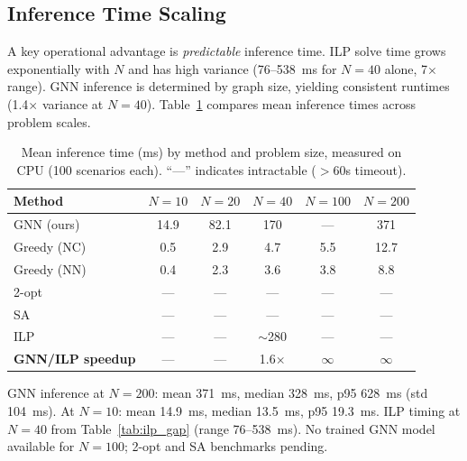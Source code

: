 \documentclass[conference]{IEEEtran}
\begin{document}
\subsection{Inference Time Scaling}\label{sec:timing}

A key operational advantage is \emph{predictable} inference time. ILP solve time grows exponentially with $N$ and has high variance (76--538~ms for $N{=}40$ alone, 7$\times$ range). GNN inference is determined by graph size, yielding consistent runtimes (1.4$\times$ variance at $N{=}40$). Table~\ref{tab:timing} compares mean inference times across problem scales.

\begin{table}[htbp]
\caption{Mean inference time (ms) by method and problem size, measured on CPU (100 scenarios each). ``---'' indicates intractable ($>$60s timeout).}
\label{tab:timing}
\centering
\begin{tabular}{@{}lccccc@{}}
\toprule
\textbf{Method} & $N{=}10$ & $N{=}20$ & $N{=}40$ & $N{=}100$ & $N{=}200$ \\
\midrule
GNN (ours)    & 14.9  & 82.1  & 170   & ---   & 371 \\
Greedy (NC)   & 0.5   & 2.9   & 4.7   & 5.5   & 12.7 \\
Greedy (NN)   & 0.4   & 2.3   & 3.6   & 3.8   & 8.8 \\
2-opt         & ---   & ---   & ---   & ---   & --- \\
SA            & ---   & ---   & ---   & ---   & --- \\
ILP           & ---   & ---   & $\sim$280 & ---  & --- \\
\midrule
\textbf{GNN/ILP speedup} & ---  & ---  & 1.6$\times$ & $\infty$ & $\infty$ \\
\bottomrule
\end{tabular}
\vspace{1mm}

\footnotesize GNN inference at $N{=}200$: mean 371~ms, median 328~ms, p95 628~ms (std 104~ms). At $N{=}10$: mean 14.9~ms, median 13.5~ms, p95 19.3~ms. ILP timing at $N{=}40$ from Table~\ref{tab:ilp_gap} (range 76--538~ms). No trained GNN model available for $N{=}100$; 2-opt and SA benchmarks pending.
\end{table}
\end{document}

